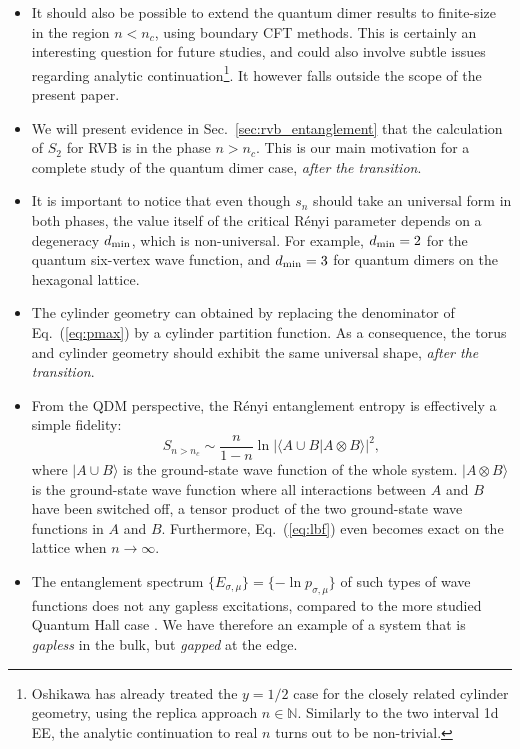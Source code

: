 \documentclass[11pt]{iopart}
\begin{document}
\begin{itemize}
 \item It should also be possible to extend the quantum dimer results\cite{Misguich,Oshikawa,Zaletel,Stephan11} to finite-size in the region $n<n_c$, using boundary CFT methods. This is certainly an interesting question for future studies, and could also involve subtle issues regarding analytic continuation\footnote{Oshikawa\cite{Oshikawa} has already treated the $y=1/2$ case for the closely related cylinder geometry, using the replica approach $n\in \mathbb{N}$. Similarly to the two interval 1d EE\cite{CCT1,CCT2}, the analytic continuation to real $n$ turns out to be non-trivial.}. It however falls outside the scope of the present paper.
 \item We will present evidence in Sec.~\ref{sec:rvb_entanglement} that the calculation of $S_2$ for RVB is in the phase $n>n_c$. This is our main motivation for a complete study of the quantum dimer case, \emph{after the transition}.
 \item It is important to notice that even though $s_n$ should take an universal form in both phases, the value itself of the critical R\'enyi parameter depends on a degeneracy $d_{\rm min}$, which is non-universal. For example, $d_{\rm min}=2$ for the quantum six-vertex wave function, and $d_{\rm min}=3$ for quantum dimers on the hexagonal lattice. 
 \item The cylinder geometry can obtained by replacing the denominator of Eq.~(\ref{eq:pmax}) by a cylinder partition function. As a consequence, the torus and cylinder geometry should exhibit the same universal shape, \emph{after the transition}.
 \item From the QDM perspective, the R\'enyi entanglement entropy is effectively a simple fidelity\cite{Bipartite_fidelity}:
 \begin{equation}\label{eq:lbf}
  S_{n>n_c}\sim \frac{n}{1-n} \ln \left|\langle A\cup B|A\otimes B\rangle\right|^2,
 \end{equation}
where $|A\cup B\rangle$ is the ground-state wave function of the whole system. $|A\otimes B\rangle$ is the ground-state wave function where all interactions between $A$ and $B$ have been switched off, a tensor product of the two ground-state wave functions in $A$ and $B$. Furthermore, Eq.~(\ref{eq:lbf}) even becomes exact on the lattice when $n\to \infty$.
  \item The entanglement spectrum $\{E_{\sigma,\mu}\}=\{-\ln p_{\sigma,\mu}\}$ of such types of wave functions does not any gapless excitations, compared to the more studied Quantum Hall case \cite{HaldaneLi}. We have therefore an example of a system that is \emph{gapless} in the bulk, but \emph{gapped} at the edge. 
\end{itemize}
\end{document}
